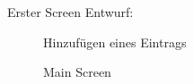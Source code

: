 \documentclass[
    DIV12,
    cleardouble=plain,
    headings=normal,
    pdftex,
    headexclude,footexclude,
    final
]{scrreprt}
\begin{document}
Erster Screen Entwurf:

\begin{figure}[ht]
	\centering
	\caption{Hinzufügen eines Eintrags}
	\label{fig1}
\end{figure}


\begin{figure}[ht]
	\centering
	\caption{Main Screen}
	\label{fig1}
\end{figure}
\end{document}
